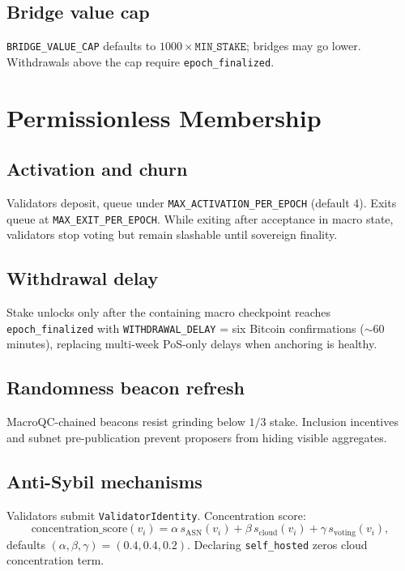 \documentclass[11pt,a4paper,twoside]{report}
\theoremstyle{definition}
\begin{document}
\section{Bridge value cap}
\texttt{BRIDGE\_VALUE\_CAP} defaults to $1000 \times \texttt{MIN\_STAKE}$; bridges may go lower. Withdrawals above the cap require \texttt{epoch\_finalized}.

\chapter{Permissionless Membership}

\section{Activation and churn}
Validators deposit, queue under \texttt{MAX\_ACTIVATION\_PER\_EPOCH} (default 4). Exits queue at \texttt{MAX\_EXIT\_PER\_EPOCH}. While exiting after acceptance in macro state, validators stop voting but remain slashable until sovereign finality.

\section{Withdrawal delay}
Stake unlocks only after the containing macro checkpoint reaches \texttt{epoch\_finalized} with \texttt{WITHDRAWAL\_DELAY} = six Bitcoin confirmations ($\sim$60\,minutes), replacing multi-week PoS-only delays when anchoring is healthy.

\section{Randomness beacon refresh}
MacroQC-chained beacons resist grinding below $1/3$ stake. Inclusion incentives and subnet pre-publication prevent proposers from hiding visible aggregates.

\section{Anti-Sybil mechanisms}
\label{sec:antisybil}
Validators submit \texttt{ValidatorIdentity}. Concentration score:
\begin{equation}
  \mathrm{concentration\_score}(v_i) =
    \alpha\, s_{\mathrm{ASN}}(v_i) + \beta\, s_{\mathrm{cloud}}(v_i) + \gamma\, s_{\mathrm{voting}}(v_i),
\end{equation}
defaults $(\alpha,\beta,\gamma) = (0.4, 0.4, 0.2)$. Declaring \texttt{self\_hosted} zeros cloud concentration term.
\end{document}
